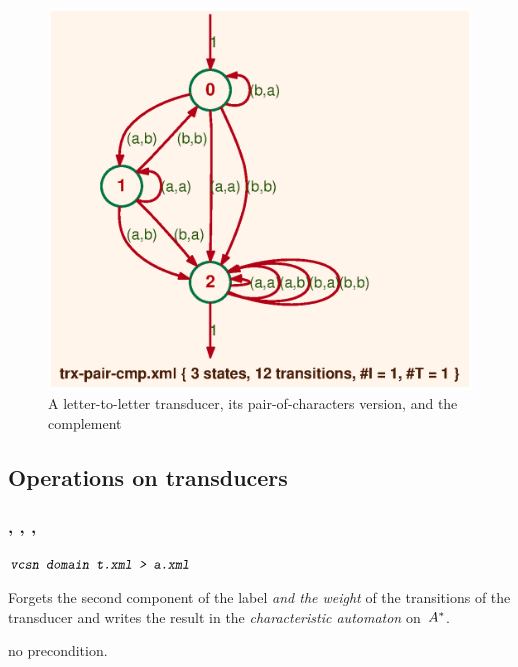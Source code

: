 \begin{figure}[ht]
\PushLine 
\includegraphics[scale=0.4]{figures/trx-pair-cmp.ps}
\caption{A letter-to-letter transducer, its pair-of-characters 
version, and the complement}
\label{fig:ltl-pai}
\end{figure}

\subsection{Operations on transducers}

\subsubsection{, , , }
\label{ssc:fmp-dom-ima}

\begin{SwClCmd}
\begin{shell}
$ \textsl{\texttt{vcsn domain t.xml > a.xml}}
$
\end{shell}%
\end{SwClCmd}%
\begin{SwClTxt}
    Forgets the second component of the label \emph{and the weight} of the 
    transitions of the transducer  
     and writes the result in the \emph{characteristic automaton} 
     on~${{A}^{*}}$. 
\end{SwClTxt}%

\Prec no precondition.

